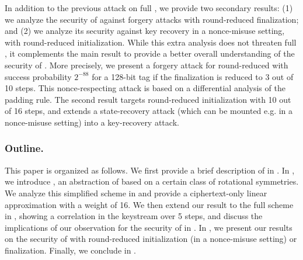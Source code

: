 In addition to the previous attack on full \MORUS, we provide two secondary results: (1) we analyze the security of \MORUS against forgery attacks with round-reduced finalization; and (2) we analyze its security against key recovery in a nonce-misuse setting, with round-reduced initialization.
While this extra analysis does not threaten full \MORUS, it complements the main result to provide a better overall understanding of the security of \MORUS.
More precisely, we present a forgery attack for round-reduced \MORUS[1280] with success probability $2^{-88}$ for a 128-bit tag if the finalization is reduced to 3 out of 10 steps. This nonce-respecting attack is based on a differential analysis of the padding rule.
The second result targets round-reduced initialization with 10 out of 16 steps, and extends a state-recovery attack (which can be mounted e.g. in a nonce-misuse setting) into a key-recovery attack.

\subsubsection*{Outline.}
This paper is organized as follows.
We first provide a brief description of \MORUS in .
In , we introduce \MiniMORUS, an abstraction of \MORUS based on a certain class of rotational symmetries.
We analyze this simplified scheme in  and provide a ciphertext-only linear approximation with a weight of 16.
We then extend our result to the full scheme in , showing a correlation in the keystream over 5 steps,
and discuss the implications of our observation for the security of \MORUS in .
In , we present our results on the security of \MORUS with round-reduced initialization (in a nonce-misuse setting) or finalization.
Finally, we conclude in .

